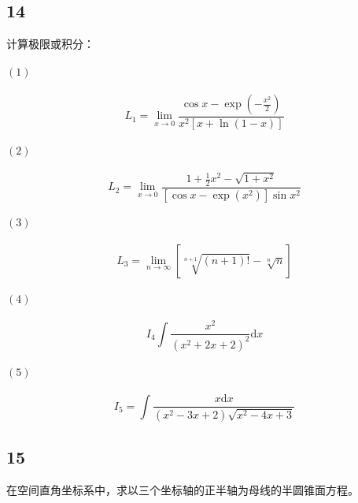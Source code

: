 \documentclass[a4paper,12pt]{article}
\begin{document}
\subsection*{14}
计算极限或积分：
\paragraph{$\left(1\right)$}\begin{equation*}
	L_{1}=\lim\limits_{x\rightarrow 0}\frac{\cos x-\exp\left(-\frac{x^2}{2}\right)}{x^2\left[x+\ln\left(1-x\right)\right]}
\end{equation*}
\paragraph{$\left(2\right)$}\begin{equation*}
	L_{2}=\lim\limits_{x\rightarrow 0}\frac{1+\frac{1}{2}x^2-\sqrt{1+x^2}}{\left[\cos x-\exp\left(x^2\right)\right]\sin x^2}
\end{equation*}
\paragraph{$\left(3\right)$}\begin{equation*}
	L_{3}=\lim\limits_{n\rightarrow\infty}\left[\sqrt[n+1]{\left(n+1\right)!}-\sqrt[n]{n}\right]
\end{equation*}
\paragraph{$\left(4\right)$}\begin{equation*}
	I_{4}\int\frac{x^2}{\left(x^2+2x+2\right)^2}\mathrm{d}x
\end{equation*}
\paragraph{$\left(5\right)$}
\begin{equation*}
	I_{5}=\int\frac{x\mathrm{d}x}{\left(x^2-3x+2\right)\sqrt{x^2-4x+3}}
\end{equation*}
\subsection*{15}\noindent 在空间直角坐标系中，求以三个坐标轴的正半轴为母线的半圆锥面方程。
\end{document}
